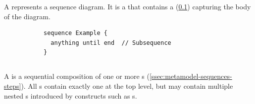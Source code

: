 A \msequence{} represents a sequence diagram.  It is a \mnamedelement{}
that contains a \msubsequence{} (\cref{ssec:metamodel-sequences-subsequences})
capturing the body of the diagram.

\begin{figure}[h!]

  \begin{subfigure}[t]{\egtextwidth}
    \begin{lstlisting}[style=Example]
sequence Example {
  anything until end  // Subsequence
}
    \end{lstlisting}
  \end{subfigure}
  \hfill
  \begin{subfigure}[t]{\eggraphicalwidth}
    \gsecaption
    \centering
  \end{subfigure}

\end{figure}

\subsection{\msubsequence}\label{ssec:metamodel-sequences-subsequences}

A \msubsequence{} is a sequential composition of one or more \msequencestep s
(\cref{ssec:metamodel-sequences-steps}).
All \msequence s contain exactly one \msubsequence{} at the top level, but
may contain multiple nested \msubsequence s introduced by constructs such as
\mloopaction s.

